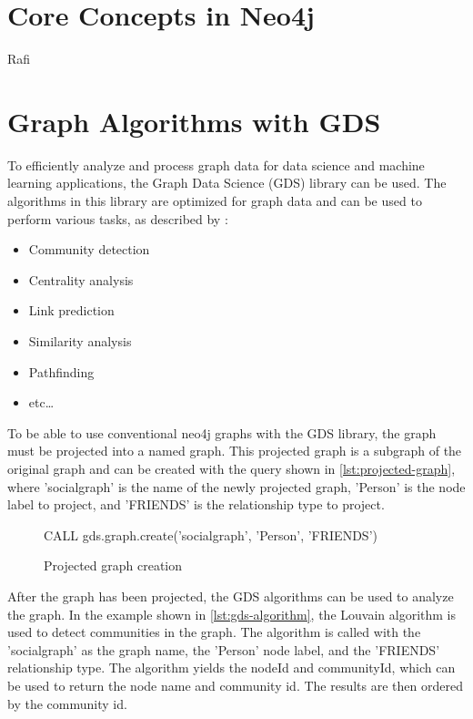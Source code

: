 \documentclass[english,smartquotes,apa]{hgbreport}
\begin{document}
\section*{Core Concepts in Neo4j}

Rafi


\section*{Graph Algorithms with GDS}

To efficiently analyze and process graph data for data science and machine learning applications, the Graph Data Science (GDS) library can be used. The algorithms in this library are optimized for graph data and can be used to perform various tasks, as described by \cite{neo4j-gds}:

\begin{itemize}
	\item Community detection
	\item Centrality analysis
	\item Link prediction
	\item Similarity analysis
	\item Pathfinding
	\item etc\dots
\end{itemize}

To be able to use conventional neo4j graphs with the GDS library, the graph must be projected into a named graph. This projected graph is a subgraph of the original graph and can be created with the query shown in \autoref{lst:projected-graph}, where 'socialgraph' is the name of the newly projected graph, 'Person' is the node label to project, and 'FRIENDS' is the relationship type to project.

\begin{figure}[h]
	\begin{GenericCode}[numbers=none]
	CALL gds.graph.create('socialgraph', 'Person', 'FRIENDS')
	\end{GenericCode}
	\caption{Projected graph creation}
	\label{lst:projected-graph}
\end{figure}

After the graph has been projected, the GDS algorithms can be used to analyze the graph. In the example shown in \autoref{lst:gds-algorithm}, 
the Louvain algorithm is used to detect communities in the graph. The algorithm is called with the 'socialgraph' as the graph name, the 'Person' node label, and the 'FRIENDS' relationship type. The algorithm yields the nodeId and communityId, which can be used to return the node name and community id. The results are then ordered by the community id.
\end{document}
